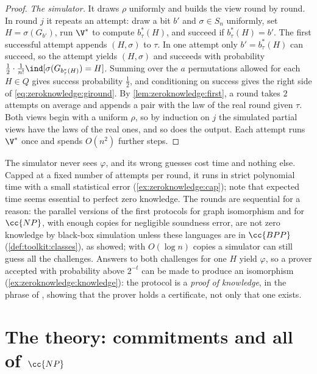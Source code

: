 \begin{refsection}
\begin{proof}
\emph{The simulator.} It draws $\rho$ uniformly and builds the view round by round. In round $j$ it repeats an attempt: draw a bit $b'$ and $\sigma\in S_n$ uniformly, set $H=\sigma(G_{b'})$, run $\V^*$ to compute $b^*_\tau(H)$, and succeed if $b^*_\tau(H)=b'$. The first successful attempt appends $(H,\sigma)$ to $\tau$. In one attempt only $b'=b^*_\tau(H)$ can succeed, so the attempt yields $(H,\sigma)$ and succeeds with probability $\frac12\cdot\frac1{n!}\ind[\sigma(G_{b^*_\tau(H)})=H]$. Summing over the $a$ permutations allowed for each $H\in Q$ gives success probability $\frac12$, and conditioning on success gives the right side of \eqref{eq:zeroknowledge:giround}. By \cref{lem:zeroknowledge:first}, a round takes $2$ attempts on average and appends a pair with the law of the real round given $\tau$. Both views begin with a uniform $\rho$, so by induction on $j$ the simulated partial views have the laws of the real ones, and so does the output. Each attempt runs $\V^*$ once and spends $O(n^2)$ further steps.
\end{proof}

The simulator never sees $\varphi$, and its wrong guesses cost time and nothing else. Capped at a fixed number of attempts per round, it runs in strict polynomial time with a small statistical error (\cref{ex:zeroknowledge:cap}); \textcite[Remark~11]{GoldreichMicaliWigderson1991} note that expected time seems essential to perfect zero knowledge. The rounds are sequential for a reason: the parallel versions of the first protocols for graph isomorphism and for $\cc{NP}$, with enough copies for negligible soundness error, are not zero knowledge by black-box simulation unless these languages are in $\cc{BPP}$ (\cref{def:toolkit:classes}), as \textcite{GoldreichKrawczyk1996} showed; with $O(\log n)$ copies a simulator can still guess all the challenges. Answers to both challenges for one $H$ yield $\varphi$, so a prover accepted with probability above $2^{-t}$ can be made to produce an isomorphism (\cref{ex:zeroknowledge:knowledge}): the protocol is a \emph{proof of knowledge}, in the phrase of \textcite{BrassardChaumCrepeau1988}, showing that the prover holds a certificate, not only that one exists.

\section{The theory: commitments and all of \texorpdfstring{$\cc{NP}$}{NP}}\label{sec:zeroknowledge:np}


\end{refsection}
